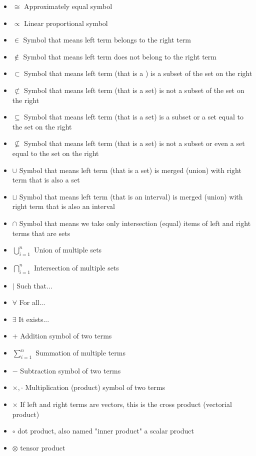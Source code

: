 \documentclass[12pt,a4paper,twoside,openright]{report}
\theoremstyle{definition}
\theoremstyle{itexmp}
\numberwithin{equation}{section}
\begin{document}
\begin{itemize}[label={},leftmargin=0.5cm]
	 	\item $\cong$ Approximately equal symbol
	 	\item $\propto$ Linear proportional symbol 
	 	\item $\in$ Symbol that means left term belongs to the right term
	 	\item $\not\in$ Symbol that means left term does not belong to the right term
	 	\item $\subset$ Symbol that means left term (that is a ) is a subset of the set on the right 
	 	\item $\not\subset$ Symbol that means left term (that is a set) is not a subset of the set on the right
	 	\item $\subseteq$ Symbol that means left term (that is a set) is a subset or a set equal to the set on the right
	 	\item $\not\subseteq$ Symbol that means left term (that is a set) is not a subset or even a set equal to the set on the right
	 	\item $\cup$ Symbol that means left term (that is a set) is merged (union) with right term that is also a set
	 	\item $\sqcup$ Symbol that means left term (that is an interval) is merged (union) with right term that is also an interval
	 	\item $\cap$ Symbol that means we take only intersection (equal) items of left and right terms that are sets
	 	\item $\displaystyle \bigcup_{i=1}^n$ Union of multiple sets
	 	\item $\displaystyle \bigcap_{i=1}^n$ Intersection of multiple sets
	 	\item $\mid$ Such that...
	 	\item $\forall$ For all...
	 	\item $\exists$ It exists...
	 	\item $+$ Addition symbol of two terms
	 	\item $\displaystyle \sum_{i=1}^n$ Summation of multiple terms
	 	\item $-$ Subtraction symbol of two terms
	 	\item $\times, \cdot$ Multiplication (product) symbol of two terms
	 	\item $\times$ If left and right terms are vectors, this is the cross product (vectorial product)
	 	\item $\circ$ dot product, also named "inner product" a scalar product
	 	\item $\otimes$ tensor product

\end{itemize}
\end{document}

